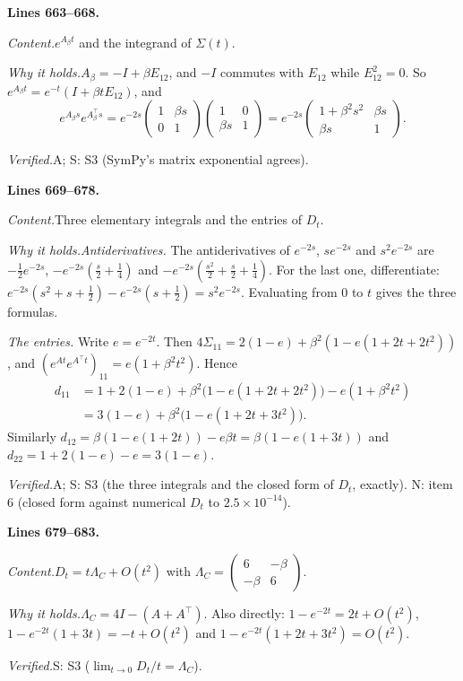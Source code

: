 \documentclass[11pt]{amsart}
\newcommand{\tp}{\top}
\newcommand{\src}[1]{\par\bigskip\noindent\textbf{Lines #1.}\enspace}
\newcommand{\content}{\par\smallskip\noindent\textit{Content.}\enspace}
\newcommand{\why}{\par\smallskip\noindent\textit{Why it holds.}\enspace}
\newcommand{\verified}{\par\smallskip\noindent\textit{Verified.}\enspace}
\newcommand{\tA}{\textsf{A}}
\newcommand{\tS}{\textsf{S}}
\newcommand{\tN}{\textsf{N}}
\begin{document}
\src{663--668}
\content $e^{A_\beta t}$ and the integrand of $\Sigma(t)$.
\why $A_\beta=-I+\beta E_{12}$, and $-I$ commutes with $E_{12}$ while $E_{12}^2=0$. So
$e^{A_\beta t}=e^{-t}(I+\beta tE_{12})$, and
\[
e^{A_\beta s}e^{A_\beta^\tp s}=e^{-2s}\begin{pmatrix}1&\beta s\\0&1\end{pmatrix}
\begin{pmatrix}1&0\\\beta s&1\end{pmatrix}=e^{-2s}\begin{pmatrix}1+\beta^2s^2&\beta s\\\beta s&1\end{pmatrix}.
\]
\verified \tA; \tS: S3 (SymPy's matrix exponential agrees).

\src{669--678}
\content Three elementary integrals and the entries of $D_t$.
\why \emph{Antiderivatives.} The antiderivatives of $e^{-2s}$, $se^{-2s}$ and $s^2e^{-2s}$ are $-\frac12e^{-2s}$,
$-e^{-2s}(\frac s2+\frac14)$ and $-e^{-2s}(\frac{s^2}2+\frac s2+\frac14)$. For the last one, differentiate:
$e^{-2s}(s^2+s+\frac12)-e^{-2s}(s+\frac12)=s^2e^{-2s}$. Evaluating from $0$ to $t$ gives the three formulas.

\emph{The entries.} Write $e=e^{-2t}$. Then $4\Sigma_{11}=2(1-e)+\beta^2(1-e(1+2t+2t^2))$, and
$(e^{At}e^{A^\tp t})_{11}=e(1+\beta^2t^2)$. Hence
\begin{align*}
d_{11}&=1+2(1-e)+\beta^2\bigl(1-e(1+2t+2t^2)\bigr)-e(1+\beta^2t^2)\\
&=3(1-e)+\beta^2\bigl(1-e(1+2t+3t^2)\bigr).
\end{align*}
Similarly $d_{12}=\beta(1-e(1+2t))-e\beta t=\beta(1-e(1+3t))$ and $d_{22}=1+2(1-e)-e=3(1-e)$.
\verified \tA; \tS: S3 (the three integrals and the closed form of $D_t$, exactly). \tN: item 6 (closed form against
numerical $D_t$ to $2.5\times10^{-14}$).

\src{679--683}
\content $D_t=t\Lambda_C+O(t^2)$ with $\Lambda_C=\begin{pmatrix}6&-\beta\\-\beta&6\end{pmatrix}$.
\why $\Lambda_C=4I-(A+A^\tp)$. Also directly: $1-e^{-2t}=2t+O(t^2)$, $1-e^{-2t}(1+3t)=-t+O(t^2)$ and
$1-e^{-2t}(1+2t+3t^2)=O(t^2)$.
\verified \tS: S3 ($\lim_{t\to0}D_t/t=\Lambda_C$).
\end{document}
